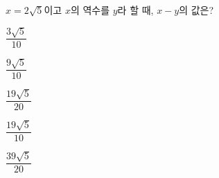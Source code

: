 $x=2\sqrt{5}$이고 $x$의 역수를 $y$라 할 때, $x-y$의 값은?
\begin{choices32}{\rule[-3ex]{0pt}{8ex}$\dfrac{3\sqrt{5}}{10}$}{\rule[-3ex]{0pt}{8ex}$\dfrac{9\sqrt{5}}{10}$}{\rule[-3ex]{0pt}{8ex}$\dfrac{19\sqrt{5}}{20}$}{\rule[-3ex]{0pt}{8ex}$\dfrac{19\sqrt{5}}{10}$}{\rule[-3ex]{0pt}{8ex}$\dfrac{39\sqrt{5}}{20}$}\end{choices32}
